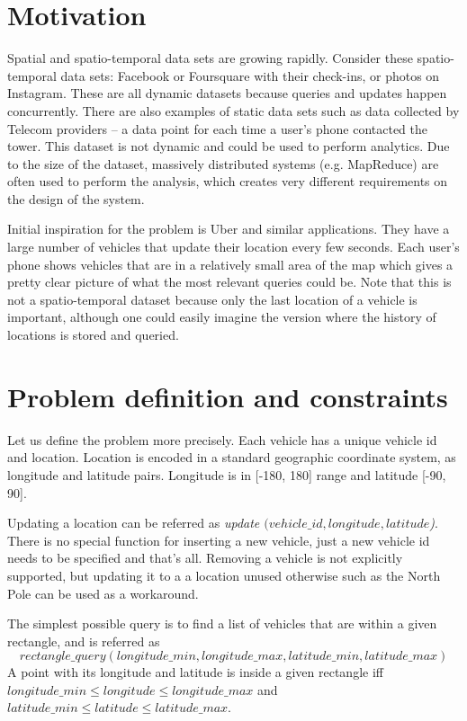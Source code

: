 \documentclass[times, utf8, diplomski]{fer}
\begin{document}

\section{Motivation}
Spatial and spatio-temporal data sets are growing rapidly. Consider these spatio-temporal data sets: Facebook or Foursquare with their check-ins, or photos on Instagram. These are all dynamic datasets because queries and updates happen concurrently. There are also examples of static data sets such as data collected by Telecom providers -- a data point for each time a user's phone contacted the tower. This dataset is not dynamic and could be used to perform analytics. Due to the size of the dataset, massively distributed systems (e.g. MapReduce) are often used to perform the analysis, which creates very different requirements on the design of the system.

Initial inspiration for the problem is Uber and similar applications. They have a large number of vehicles that update their location every few seconds. Each user's phone shows vehicles that are in a relatively small area of the map which gives a pretty clear picture of what the most relevant queries could be. Note that this is not a spatio-temporal dataset because only the last location of a vehicle is important, although one could easily imagine the version where the history of locations is stored and queried.

\section{Problem definition and constraints}
Let us define the problem more precisely. Each vehicle has a unique vehicle id and location. Location is encoded in a standard geographic coordinate system, as longitude and latitude pairs. Longitude is in [-180, 180] range and latitude [-90, 90].

Updating a location can be referred as \emph{update $(vehicle\_id, longitude, latitude$)}. There is no special function for inserting a new vehicle, just a new vehicle id needs to be specified and that's all. Removing a vehicle is not explicitly supported, but updating it to a a location unused otherwise such as the North Pole can be used as a workaround.

The simplest possible query is to find a list of vehicles that are within a given rectangle, and is referred as
$$rectangle\_query (longitude\_min, longitude\_max, latitude\_min, latitude\_max)$$
A point with its longitude and latitude is inside a given rectangle iff $longitude\_min \le longitude \le longitude\_max$ and $latitude\_min \le latitude \le latitude\_max$.
\end{document}
